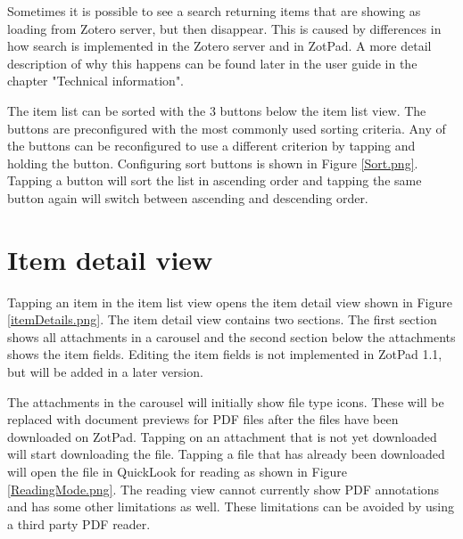 \documentclass[oneside, openany, 12pt]{tufte-book}
\newcommand{\iphone}[1]{#1}
\newcommand{\ipad}[1]{}
\newcommand{\image}[2]{
	\center
	\fbox{\texttt{[image: images/iPhone/\{\#2]}}}

	\refstepcounter{figure}
	\smallskip\noindent\small Figure \thefigure: #1
	\label{#2}
	}
\newcommand{\ipadfootnote}[1]{}
\newcommand{\iphone}[1]{}
\newcommand{\ipad}[1]{#1}
\newcommand{\image}[2]{
	\caption{#1}
	\label{#2}
	\fbox{\texttt{[image: images/iPad/\{\#2]}}}
	}
\newcommand{\ipadfootnote}[1]{\footnote{#1}}
\begin{document}
Sometimes it is possible to see a search returning items that are showing as loading from Zotero server, but then disappear. This is caused by differences in how search is implemented in the Zotero server and in ZotPad. A more detail description of why this happens can be found later in the user guide in the chapter "Technical information". 

\begin{figure}
\image{Configuring the sort buttons}{Sort.png}
\end{figure}

The item list can be sorted with the \ipad{6}\iphone{3} buttons below the item list view. The \ipad{first four} buttons are preconfigured with the most commonly used sorting criteria. Any of the buttons can be reconfigured to use a different criterion by tapping and holding the button. Configuring sort buttons is shown in Figure \ref{Sort.png}. Tapping a button will sort the list in ascending order and tapping the same button again will switch between ascending and descending order. 

\FloatBarrier

	\section{Item detail view}

Tapping an item in the item list view opens the item detail view shown in Figure \ref{itemDetails.png}. \ipad{Opening the item detail view will push the item list into the navigator to allow quickly switching between items.

}The item detail view contains two sections. The first section shows all attachments in a carousel and the second section below the attachments shows the item fields. Editing the item fields is not implemented in ZotPad 1.1, but will be added in a later version.

The attachments in the carousel will initially show file type icons. These will be replaced with document previews for PDF files after the files have been downloaded on ZotPad. Tapping on an attachment\ipadfootnote{Both imported items and web site snapshots are normal items that can be downloaded and viewed on ZotPad.} that is not yet downloaded will start downloading the file. Tapping a file that has already been downloaded will open the file in QuickLook for reading as shown in Figure \ref{ReadingMode.png}. The reading view cannot currently show PDF annotations and has some other limitations as well. These limitations can be avoided by using a third party PDF reader.
\end{document}
